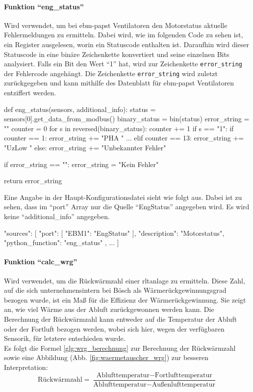 \paragraph{Funktion \enquote{eng\_status}}
Wird verwendet, um bei ebm-papst Ventilatoren den Motorstatus \bzw aktuelle Fehlermeldungen zu ermitteln. Dabei wird, wie im folgenden Code zu sehen ist, ein Register ausgelesen, worin ein Statuscode enthalten ist. Daraufhin wird dieser Statuscode in eine binäre Zeichenkette konvertiert und seine einzelnen Bits analysiert. Falls ein Bit den Wert \enquote{1} hat, wird zur Zeichenkette \lstinline{error_string} der Fehlercode angehängt. Die Zeichenkette \lstinline{error_string} wird zuletzt zurückgegeben und kann mithilfe des Datenblatt für ebm-papst Ventilatoren \cite[vgl.][119]{ebmpapst:2020} entziffert werden. 

\begin{pythoncode}
def eng_status(sensors, additional_info):
	status = sensors[0].get_data_from_modbus()
	binary_status = bin(status)
	error_string = ""
	counter = 0
	for s in reversed(binary_status):
		counter += 1
		if s == "1":
			if counter == 1:
				error_string += "PHA "
			...
			elif counter == 13:
				error_string += "UzLow "
			else:
				error_string += "Unbekannter Fehler"
			
	if error_string == "":
		error_string = "Kein Fehler"
	
	return error_string
\end{pythoncode}

Eine Angabe in der Haupt-Konfigurationsdatei sieht wie folgt aus. Dabei ist zu sehen, dass im \enquote{port} Array nur die Quelle \enquote{EngStatus} angegeben wird. Es wird keine \enquote{additional\_info} angegeben.

\begin{jsoncode}
"sources": [
	{
		"port": [
			{"EBM1": "EngStatus"}
		],
		"description": "Motorstatus",
		"python_function": "eng_status"
	},
	...
]
\end{jsoncode}



\paragraph{Funktion \enquote{calc\_wrg}}
Wird verwendet, um die Rückwärmzahl einer \acs{rltanlage} zu ermitteln. Diese Zahl, auf die sich unternehmensintern bei Bösch als Wärmerückgewinnungsgrad bezogen wurde, ist ein Maß für die Effizienz der Wärmerückgewinnung. Sie zeigt an, wie viel Wärme aus der Abluft zurückgewonnen werden kann. Die Berechnung der Rückwärmzahl kann entweder auf die Temperatur der Abluft oder der Fortluft bezogen werden, wobei sich hier, wegen der verfügbaren Sensorik, für letztere entschieden wurde. \cite[vgl.][]{Klingenburg:o.J.}\\
Es folgt die Formel \eqref{glg:wrg_berechnung} zur Berechnung der Rückwärmzahl sowie eine Abbildung (Abb. \ref{fig:waermetauscher_wrg}) zur besseren Interpretation: 
\begin{equation}
	\text{Rückwärmzahl} = \frac{\text{Ablufttemperatur} - \text{Fortlufttemperatur}}{\text{Ablufttemperatur} - \text{Außenlufttemperatur}}
	\label{glg:wrg_berechnung}
\end{equation} 


